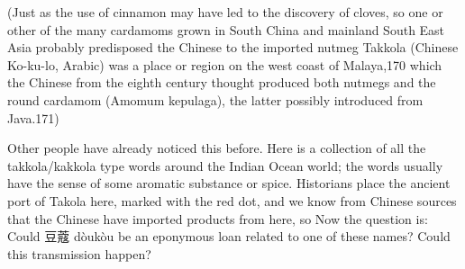 \documentclass[12pt]{article}
\begin{document}
(Just as the use of cinnamon may have led to the discovery of cloves, so one or other of the many cardamoms grown in South China and mainland South East Asia probably predisposed the Chinese to the imported nutmeg Takkola (Chinese Ko-ku-lo, Arabic) was a place or region on the west coast of Malaya,170 which the Chinese from the eighth century thought produced both nutmegs and the round cardamom (Amomum kepulaga), the latter possibly introduced from Java.171)



Other people have already noticed this before. Here is a collection of all the takkola/kakkola type words around the Indian Ocean world; the words usually have the sense of some aromatic substance or spice. 
Historians place the ancient port of Takola here, marked with the red dot, and we know from Chinese sources that the Chinese have imported products from here, so
Now the question is: Could 豆蔻 dòukòu be an eponymous loan related to one of these names? Could this transmission happen?






\printbibliography
\end{document}
